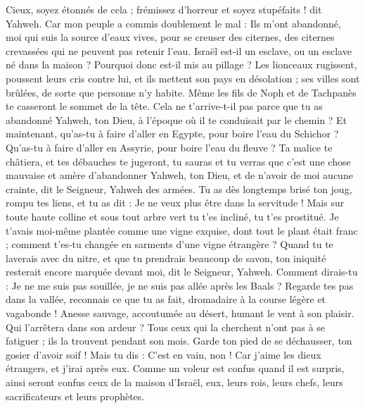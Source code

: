 \begin{multicols}{2}
Cieux, soyez étonnés de cela ; frémissez d’horreur et soyez stupéfaits ! dit Yahweh.
Car mon peuple a commis doublement le mal : Ils m'ont abandonné, moi qui suis la source d’eaux vives, pour se creuser des citernes, des citernes crevassées qui ne peuvent pas retenir l’eau.
Israël est-il un esclave, ou un esclave né dans la maison ? Pourquoi donc est-il mis au pillage ?
Les lionceaux rugissent, poussent leurs cris contre lui, et ils mettent son pays en désolation ; ses villes sont brûlées, de sorte que personne n’y habite.
Même les fils de Noph et de Tachpanès te casseront le sommet de la tête.
Cela ne t’arrive-t-il pas parce que tu as abandonné Yahweh, ton Dieu, à l’époque où il te conduisait par le chemin ?
Et maintenant, qu'as-tu à faire d'aller en Egypte, pour boire l'eau du Schichor ? Qu'as-tu à faire d'aller en Assyrie, pour boire l'eau du fleuve ?
Ta malice te châtiera, et tes débauches te jugeront, tu sauras et tu verras que c'est une chose mauvaise et amère d’abandonner Yahweh, ton Dieu, et de n’avoir de moi aucune crainte, dit le Seigneur, Yahweh des armées.
Tu as dès longtemps brisé ton joug, rompu tes liens, et tu as dit : Je ne veux plus être dans la servitude ! Mais sur toute haute colline et sous tout arbre vert tu t’es incliné, tu t’es prostitué.
Je t'avais moi-même plantée comme une vigne exquise, dont tout le plant était franc ; comment t'es-tu changée en sarments d'une vigne étrangère ?
Quand tu te laverais avec du nitre, et que tu prendrais beaucoup de savon, ton iniquité resterait encore marquée devant moi, dit le Seigneur, Yahweh.
Comment dirais-tu : Je ne me suis pas souillée, je ne suis pas allée après les Baals ? Regarde tes pas dans la vallée, reconnais ce que tu as fait, dromadaire à la course légère et vagabonde !
Anesse sauvage, accoutumée au désert, humant le vent à son plaisir. Qui l’arrêtera dans son ardeur ? Tous ceux qui la cherchent n’ont pas à se fatiguer ; ils la trouvent pendant son mois.
Garde ton pied de se déchausser, ton gosier d’avoir soif ! Mais tu dis : C’est en vain, non ! Car j'aime les dieux étrangers, et j'irai après eux.
Comme un voleur est confus quand il est surpris, ainsi seront confus ceux de la maison d'Israël, eux, leurs rois, leurs chefs, leurs sacrificateurs et leurs prophètes.

\end{multicols}
